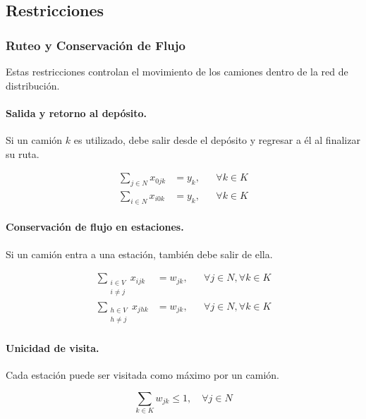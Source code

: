 \subsection{Restricciones}

\subsubsection{Ruteo y Conservación de Flujo}

Estas restricciones controlan el movimiento de los camiones dentro de la red de distribución.

\paragraph{Salida y retorno al depósito.}

Si un camión $k$ es utilizado, debe salir desde el depósito y regresar a él al finalizar su ruta.

\begin{align}
    \sum_{j \in N} x_{0jk} &= y_k, && \forall k \in K \\
    \sum_{i \in N} x_{i0k} &= y_k, && \forall k \in K
\end{align}

\paragraph{Conservación de flujo en estaciones.}

Si un camión entra a una estación, también debe salir de ella.

\begin{align}
    \sum_{\substack{i \in V \\ i \neq j}} x_{ijk} &= w_{jk}, && \forall j \in N, \forall k \in K \\
    \sum_{\substack{h \in V \\ h \neq j}} x_{jhk} &= w_{jk}, && \forall j \in N, \forall k \in K
\end{align}

\paragraph{Unicidad de visita.}

Cada estación puede ser visitada como máximo por un camión.

\begin{equation}
    \sum_{k \in K} w_{jk} \leq 1,
    \quad \forall j \in N
\end{equation}

